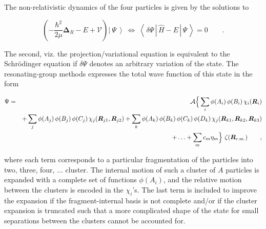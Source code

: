 \documentclass[aps,onecolumn,preprintnumbers,amsmath,amssymb,nofootinbib,superscriptaddress,notitlepage]{revtex4-1}
\newcommand{\ve}[1]{\ensuremath{\boldsymbol{#1}}}
\newcommand{\rcm}{\ensuremath{\ve{R}_\text{\scriptsize{c.m.}}}}
\newcommand{\ket}[1] {\left|~#1~\right\rangle}
\newcommand{\me}[3] {\left\langle\,#1\,\left.\left|\,#2\,\right|\right.\,#3\,\right\rangle}
\begin{document}
%
%
%

The non-relativistic dynamics of the four particles is given by the solutions to

\begin{equation}\label{eq.rgm.eqom}
\left(-\frac{\hbar^2}{2\mu}\ve{\Delta}_R-E+\mathcal{V}\right)\ket{\Psi}
~
\Leftrightarrow
~
\me{\delta\Psi}{\hat{H}-E}{\Psi}
=
0
\qquad.
\end{equation}

The second, viz. the projection/variational equation is equivalent to the Schr\"odinger equation if
$\delta\Psi$ denotes an arbitrary variation of the state.
The resonating-group methods expresses the total wave function of this state in the form

\begin{eqnarray}\label{eq.app.rgmwfkt}
\Psi
&=&
\mathcal{A}\Big\lbrace
\sum_i\phi(A_i)\,\phi(B_i)\,\chi_i(\ve{R}_i)
\nonumber\\
&&
+\sum_j\phi(A_j)\,\phi(B_j)\,\phi(C_j)\,\chi_j(\ve{R}_{j1},\ve{R}_{j2})
+\sum_k\phi(A_k)\,\phi(B_k)\,\phi(C_k)\,\phi(D_k)\,\chi_j(\ve{R}_{k1},\ve{R}_{k2},\ve{R}_{k3})
\nonumber\\
&&
+\ldots+\sum_mc_m\eta_m
\Big\rbrace~
\zeta(\rcm)
\qquad,
\end{eqnarray}

where each term corresponds to a particular fragmentation of the particles into two, three, four, $\ldots$ cluster.
The internal motion of such a cluster of $A$ particles is expanded with a complete set of functions $\phi(A_i)$, and the
relative motion between the clusters is encoded in the $\chi_i$'s. The last term is included to improve the expansion if the
fragment-internal basis is not complete and/or if the cluster expansion is truncated such that a more complicated shape
of the state for small separations between the clusters cannot be accounted for.
\end{document}
